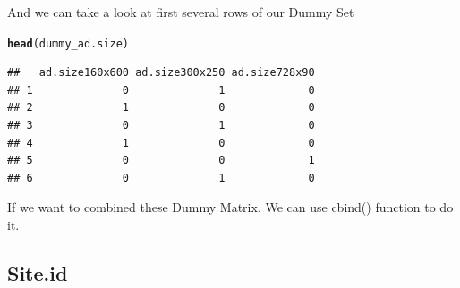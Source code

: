 \documentclass{article}\usepackage[]{graphicx}\usepackage[]{color}
\makeatletter
\newcommand{\hlstd}[1]{\textcolor[rgb]{0.345,0.345,0.345}{#1}}%
\newcommand{\hlkwd}[1]{\textcolor[rgb]{0.737,0.353,0.396}{\textbf{#1}}}%
\newenvironment{kframe}{%
 \def\at@end@of@kframe{}%
 \ifinner\ifhmode%
  \def\at@end@of@kframe{\end{minipage}}%
  \begin{minipage}{\columnwidth}%
 \fi\fi%
 \def\FrameCommand##1{\hskip\@totalleftmargin \hskip-\fboxsep
 \colorbox{shadecolor}{##1}\hskip-\fboxsep
     \hskip-\linewidth \hskip-\@totalleftmargin \hskip\columnwidth}%
 \MakeFramed {\advance\hsize-\width
   \@totalleftmargin\z@ \linewidth\hsize
   \@setminipage}}%
 {\par\unskip\endMakeFramed%
 \at@end@of@kframe}
\newenvironment{knitrout}{}{} %
\makeatother
\begin{document}
And we can take a look at first several rows of our Dummy Set

\begin{knitrout}
\color{fgcolor}\begin{kframe}
\begin{alltt}
\hlkwd{head}\hlstd{(dummy_ad.size)}
\end{alltt}
\begin{verbatim}
##   ad.size160x600 ad.size300x250 ad.size728x90
## 1              0              1             0
## 2              1              0             0
## 3              0              1             0
## 4              1              0             0
## 5              0              0             1
## 6              0              1             0
\end{verbatim}
\end{kframe}
\end{knitrout}


If we want to combined these Dummy Matrix. We can use cbind() function to do it.

\subsection{Site.id}
\label{q1-2}

 
\end{document}
